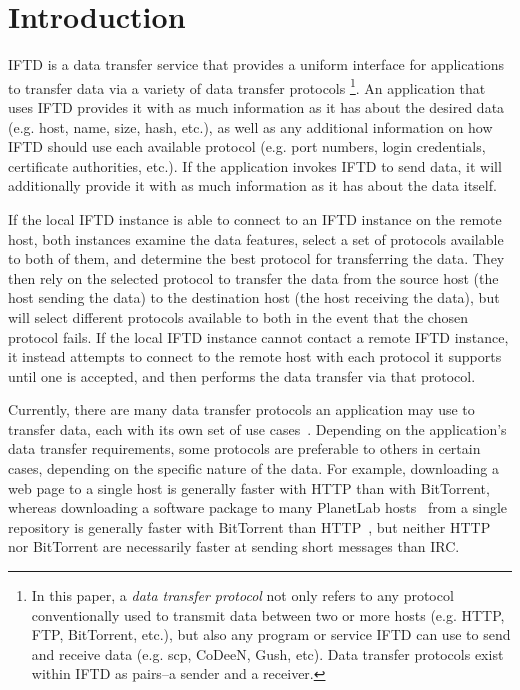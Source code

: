 \section{Introduction}

IFTD is a data transfer service that provides a uniform interface for applications to transfer data via a variety of data transfer protocols \footnote[1]{In this paper, a \textit{data transfer protocol} not only refers to any protocol conventionally used to transmit data between two or more hosts (e.g. HTTP, FTP, BitTorrent, etc.), but also any program or service IFTD can use to send and receive data (e.g. scp, CoDeeN, Gush, etc).  Data transfer protocols exist within IFTD as pairs--a sender and a receiver.}.  An application that uses IFTD provides it with as much information as it has about the desired data (e.g. host, name, size, hash, etc.), as well as any additional information on how IFTD should use each available protocol (e.g. port numbers, login credentials, certificate authorities, etc.).  If the application invokes IFTD to send data, it will additionally provide it with as much information as it has about the data itself.

If the local IFTD instance is able to connect to an IFTD instance on the remote host, both instances examine the data features, select a set of protocols available to both of them, and determine the best protocol for transferring the data.  They then rely on the selected protocol to transfer the data from the source host (the host sending the data) to the destination host (the host receiving the data), but will select different protocols available to both in the event that the chosen protocol fails.  If the local IFTD instance cannot contact a remote IFTD instance, it instead attempts to connect to the remote host with each protocol it supports until one is accepted, and then performs the data transfer via that protocol.

Currently, there are many data transfer protocols an application may use to transfer data, each with its own set of use cases~\cite{application_layer_protocols}.  Depending on the application's data transfer requirements, some protocols are preferable to others in certain cases, depending on the specific nature of the data.  For example, downloading a web page to a single host is generally faster with HTTP than with BitTorrent, whereas downloading a software package to many PlanetLab hosts~\cite{planetlab} from a single repository is generally faster with BitTorrent than HTTP~\cite{stork_paper}, but neither HTTP nor BitTorrent are necessarily faster at sending short messages than IRC.

